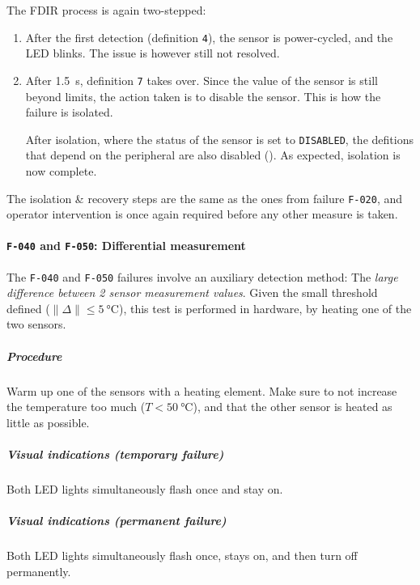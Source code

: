 \documentclass[a4paper,nobib]{tufte-book}
\begin{document}
The \acs{FDIR} process is again two-stepped:
\begin{enumerate}
	\item After the first detection (definition \texttt{4}), the sensor is power-cycled, and the \acs{LED} blinks. The issue is however still not resolved.
	\item After \SI{1.5}{\second}, definition \texttt{7} takes over. Since the value of the sensor is still beyond limits, the action taken is to disable the sensor. This is how the failure is isolated.
	
	After isolation, where the status of the sensor is set to \texttt{DISABLED}, the defitions that depend on the peripheral are also disabled (\invalid). As expected, isolation is now complete.
\end{enumerate}

The isolation \& recovery steps are the same as the ones from failure \texttt{F-020}, and operator intervention is once again required before any other measure is taken.


\clearpage
\paragraph{\textbf{\texttt{F-040} and \texttt{F-050}: Differential measurement}}\hspace{0pt}

The \texttt{F-040} and \texttt{F-050} failures involve an auxiliary detection method: The \emph{large difference between 2 sensor measurement values}. Given the small threshold defined  (\(\lVert \Delta \rVert \leq \SI{5}{\celsius}\)), this test is performed in hardware, by heating one of the two sensors.

\subparagraph{Procedure}
\begin{compactenum}
	\item Warm up one of the sensors with a heating element. Make sure to not increase the temperature too much (\(T < \SI{50}{\celsius}\)), and that the other sensor is heated as little as possible.
\end{compactenum}

\subparagraph{Visual indications (temporary failure)} Both \acs{LED} lights simultaneously flash once and stay on.
\subparagraph{Visual indications (permanent failure)} Both \acs{LED} lights simultaneously flash once, stays on, and then turn off permanently.
\end{document}
